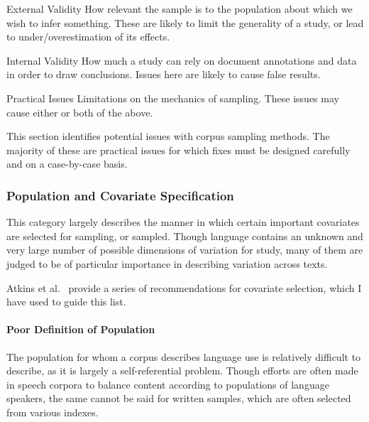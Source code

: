 \begin{itemizeTitle}
    \item[External Validity] How relevant the sample is to the population about which we wish to infer something.  These are likely to limit the generality of a study, or lead to under/overestimation of its effects.
    \item[Internal Validity] How much a study can rely on document annotations and data in order to draw conclusions.  Issues here are likely to cause false results.
    \item[Practical Issues] Limitations on the mechanics of sampling.  These issues may cause either or both of the above.
\end{itemizeTitle}

This section identifies potential issues with corpus sampling methods.  The majority of these are practical issues for which fixes must be designed carefully and on a case-by-case basis.





\subsubsection{Population and Covariate Specification}
This category largely describes the manner in which certain important covariates are selected for sampling, or sampled. Though language contains an unknown and very large number of possible dimensions of variation for study, many of them are judged to be of particular importance in describing variation across texts.

Atkins et al.~\cite{atkins1992corpus} provide a series of recommendations for covariate selection, which I have used to guide this list.




\paragraph{Poor Definition of Population}
The population for whom a corpus describes language use is relatively difficult to describe, as it is largely a self-referential problem. Though efforts are often made in speech corpora to balance content according to populations of language speakers, the same cannot be said for written samples, which are often selected from various indexes.

